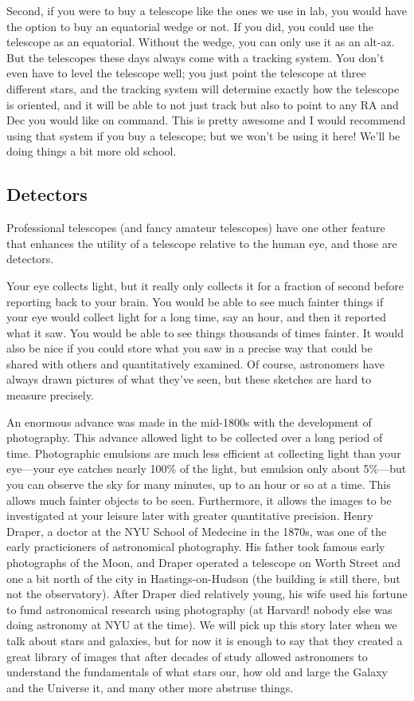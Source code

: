 \documentclass[12pt, preprint]{aastex}
\begin{document}
Second, if you were to buy a telescope like the ones we use in lab,
you would have the option to buy an equatorial wedge or not. If you
did, you could use the telescope as an equatorial. Without the wedge,
you can only use it as an alt-az. But the telescopes these days always
come with a tracking system. You don't even have to level the
telescope well; you just point the telescope at three different stars,
and the tracking system will determine exactly how the telescope is
oriented, and it will be able to not just track but also to point to
any RA and Dec you would like on command. This is pretty awesome and I
would recommend using that system if you buy a telescope; but we won't
be using it here! We'll be doing things a bit more old school.

\subsection{Detectors}

Professional telescopes (and fancy amateur telescopes) have one other
feature that enhances the utility of a telescope relative to the human
eye, and those are detectors.

Your eye collects light, but it really only collects it for a fraction
of second before reporting back to your brain.  You would be able to
see much fainter things if your eye would collect light for a long
time, say an hour, and then it reported what it saw. You would be able
to see things thousands of times fainter. It would also be nice if you
could store what you saw in a precise way that could be shared with
others and quantitatively examined. Of course, astronomers have always
drawn pictures of what they've seen, but these sketches are hard to
measure precisely.

An enormous advance was made in the mid-1800s with the development of
photography. This advance allowed light to be collected over a long
period of time. Photographic emulsions are much less efficient at
collecting light than your eye---your eye catches nearly 100\% of the
light, but emulsion only about 5\%---but you can observe the sky for
many minutes, up to an hour or so at a time. This allows much fainter
objects to be seen. Furthermore, it allows the images to be
investigated at your leisure later with greater quantitative
precision.  Henry Draper, a doctor at the NYU School of Medecine in
the 1870s, was one of the early practicioners of astronomical
photography. His father took famous early photographs of the Moon, and
Draper operated a telescope on Worth Street and one a bit north of the
city in Hastings-on-Hudson (the building is still there, but not the
observatory). After Draper died relatively young, his wife used his
fortune to fund astronomical research using photography (at Harvard!
nobody else was doing astronomy at NYU at the time). We will pick up
this story later when we talk about stars and galaxies, but for now it
is enough to say that they created a great library of images that
after decades of study allowed astronomers to understand the
fundamentals of what stars our, how old and large the Galaxy and the
Universe it, and many other more abstruse things.
\end{document}
